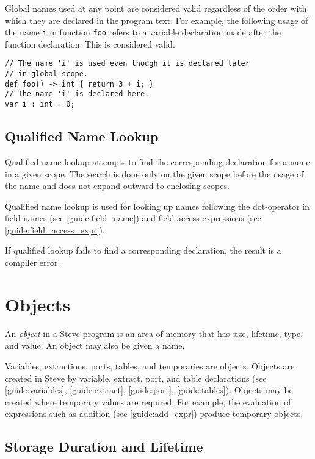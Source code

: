 Global names used at any point are considered valid regardless of the order with which they are declared in the program text. For example, the following usage of the name \texttt{i} in function \texttt{foo} refers to a variable declaration made after the function declaration. This is considered valid.

\begin{minip}
\begin{lstlisting}
// The name 'i' is used even though it is declared later
// in global scope.
def foo() -> int { return 3 + i; }
// The name 'i' is declared here.
var i : int = 0;
\end{lstlisting}
\end{minip}

\subsection{Qualified Name Lookup} \label{guide:qlfd_lookup}

Qualified name lookup attempts to find the corresponding declaration for a name in a given scope. The search is done only on the given scope before the usage of the name and does not expand outward to enclosing scopes.

Qualified name lookup is used for looking up names following the dot-operator in field names (see \ref{guide:field_name}) and field access expressions (see \ref{guide:field_access_expr}).

If qualified lookup fails to find a corresponding declaration, the result is a compiler error.

\section{Objects} \label{guide:object}

An \textit{object} in a Steve program is an area of memory that has size, lifetime, type, and value. An object may also be given a name.

Variables, extractions, ports, tables, and temporaries are objects. Objects are created in Steve by variable, extract, port, and table declarations (see \ref{guide:variables}, \ref{guide:extract}, \ref{guide:port}, \ref{guide:tables}). Objects may be created where temporary values are required. For example, the evaluation of expressions such as addition (see \ref{guide:add_expr}) produce temporary objects.

\subsection{Storage Duration and Lifetime} \label{guide:storage}

